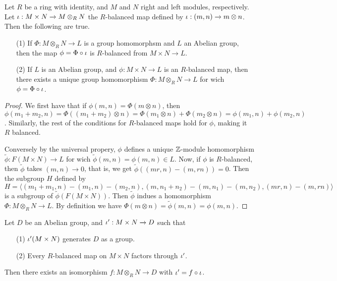 \begin{theorem}\label{4.4.6}
    Let $R$ be a ring with identity, and $M$ and $N$ right and left modules,
    respectively. Let $\iota:M \times N \xrightarrow{} M \otimes_R N$ the
    $R$-balanced map defined by $\iota:(m,n) \xrightarrow{} m \otimes n$. Then the
    following are true.
    \begin{enumerate}
        \item[(1)] If $\Phi:M \otimes_R N \xrightarrow{} L$ is a group
            homomorphsm and $L$ an Abelian group, then the map $\phi=\Phi \circ
            \iota$ is $R$-balanced from $M \times N \xrightarrow{} L$.

        \item[(2)] If $L$ is an Abelian group, and $\phi:M \times N
            \xrightarrow{} L$ is an $R$-balanced map, then there exists a unique
            group homomorphism $\Phi:M \otimes_R N \xrightarrow{} L$ for wich
            $\phi=\Phi \circ \iota$.
    \end{enumerate}
\end{theorem}
\begin{proof}
    We first have that if $\phi(m,n)=\Phi(m \otimes n)$, then
    $\phi(m_1+m_2,n)=\Phi((m_1+m_2) \otimes n)=\Phi(m_1 \otimes n)+\Phi(m_2
    \otimes n)=\phi(m_1,n)+\phi(m_2,n)$. Similarly, the rest of the conditions
    for $R$-balanced maps hold for $\phi$, making it $R$ balanced.

    Conversely by the universal propery, $\phi$ defines a unique $\mathbb{Z}$-module
    homomorphism $\tilde{\phi}:F(M \times N) \xrightarrow{} L$ for wich
    $\tilde{\phi}(m,n)=\phi(m,n) \in L$. Now, if $\phi$ is $R$-balanced, then
    $\tilde{\phi}$ takes $(m,n) \xrightarrow{} 0$, that is, we get
    $\tilde{\phi}((mr,n)-(m,rn))=0$. Then the subgroup $H$ defined by
    \begin{equation*}
        H=\langle (m_1+m_1,n)-(m_1,n)-(m_2,n), (m,n_1+n_2)-(m,n_1)-(m,n_2), (mr,n)-(m,rn) \rangle
    \end{equation*}
    is a subgroup of $\tilde{\phi}(F(M \times N))$. Then $\tilde{\phi}$ indues a
    homomorphism $\Phi:M \otimes_R N \xrightarrow{} L$. By definition we have
    $\Phi(m \otimes n)=\tilde{\phi}(m,n)=\phi(m,n)$.
\end{proof}
\begin{corollary}
    Let $D$ be an Abelian group, and $\iota':M \times N \xrightarrow{} D$ such that
    \begin{enumerate}
        \item[(1)] $\iota'(M \times N)$ generates $D$ as a group.

        \item[(2)] Every $R$-balanced map on $M \times N$ factors through $\iota'$.
    \end{enumerate}
    Then there exists an isomorphism $f:M \otimes_R N \xrightarrow{} D$ with
    $\iota'=f \circ \iota$.
\end{corollary}
